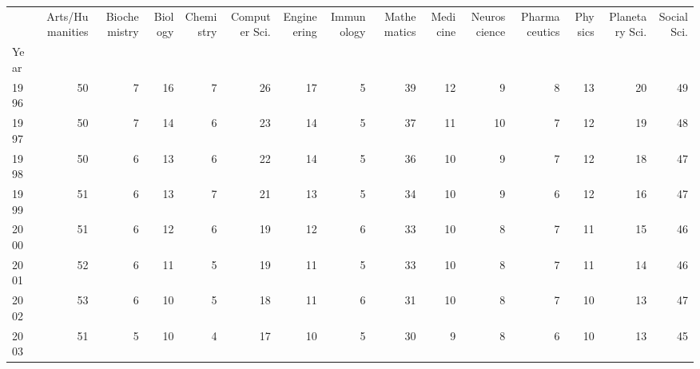 \begin{tabular}{lrrrrrrrrrrrrrr}
\toprule
{} &  Arts/Humanities &  Biochemistry &  Biology &  Chemistry &  Computer Sci. &  Engineering &  Immunology &  Mathematics &  Medicine &  Neuroscience &  Pharmaceutics &  Physics &  Planetary Sci. &  Social Sci. \\
Year &                  &               &          &            &                &              &             &              &           &               &                &          &                 &              \\
\midrule
1996 &               50 &             7 &       16 &          7 &             26 &           17 &           5 &           39 &        12 &             9 &              8 &       13 &              20 &           49 \\
1997 &               50 &             7 &       14 &          6 &             23 &           14 &           5 &           37 &        11 &            10 &              7 &       12 &              19 &           48 \\
1998 &               50 &             6 &       13 &          6 &             22 &           14 &           5 &           36 &        10 &             9 &              7 &       12 &              18 &           47 \\
1999 &               51 &             6 &       13 &          7 &             21 &           13 &           5 &           34 &        10 &             9 &              6 &       12 &              16 &           47 \\
2000 &               51 &             6 &       12 &          6 &             19 &           12 &           6 &           33 &        10 &             8 &              7 &       11 &              15 &           46 \\
2001 &               52 &             6 &       11 &          5 &             19 &           11 &           5 &           33 &        10 &             8 &              7 &       11 &              14 &           46 \\
2002 &               53 &             6 &       10 &          5 &             18 &           11 &           6 &           31 &        10 &             8 &              7 &       10 &              13 &           47 \\
2003 &               51 &             5 &       10 &          4 &             17 &           10 &           5 &           30 &         9 &             8 &              6 &       10 &              13 &           45 \\

\end{tabular}
